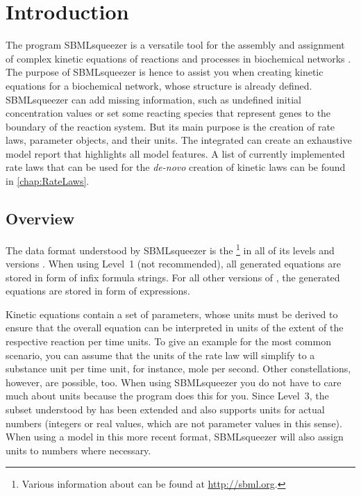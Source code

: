 \chapter{Introduction}

The program SBMLsqueezer is a versatile tool for the assembly and assignment of
complex kinetic equations of reactions and processes in biochemical networks
\citep{Draeger2008, Draeger2010a, Draeger2011a}.
The purpose of SBMLsqueezer is hence to assist you when creating kinetic equations for
a biochemical network, whose structure is already defined.
SBMLsqueezer can add missing information, such as undefined initial concentration values
or set some reacting species that represent genes to the boundary of the reaction system.
But its main purpose is the creation of rate laws, parameter objects, and their units.
The integrated \SBMLLaTeX can create an exhaustive model report that highlights all
model features.
A list of currently implemented rate laws that can be used for the \emph{de-novo}
creation of kinetic laws can be found in \vref{chap:RateLaws}.

\section{Overview}

The data format understood by SBMLsqueezer is the
\SBML\footnote{Various information about \SBML can be found at \url{http://sbml.org}.}
in all of its levels and versions \citep{Hucka2001, Hucka2003, M.Hucka03012003, Hucka2007, Hucka2008,
Hucka2010a, Finney2003, Finney2006}.
When using \SBML Level~1 (not recommended), all generated equations are stored
in form of infix formula strings. For all other versions of \SBML, the generated
equations are stored in form of \MathML \citep{Buswell1999} expressions.

Kinetic equations contain a set of parameters, whose units must be derived to
ensure that the overall equation can be interpreted in units of the extent of the
respective reaction per time units.
To give an example for the most common scenario, you can assume that the units
of the rate law will simplify to a substance unit per time unit, for instance,
mole per second.
Other constellations, however, are possible, too.
When using SBMLsqueezer you do not have to care much about units because the
program does this for you.
Since Level~3, the \MathML subset understood by \SBML has been extended and also supports
units for actual numbers (integers or real values, which are not parameter values in this sense).
When using a model in this more recent format, SBMLsqueezer will also assign units
to numbers where necessary.

